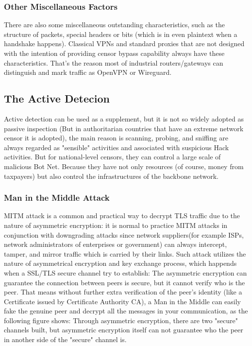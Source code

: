 \documentclass[conference]{IEEEtran}
\begin{document}

\subsubsection{Other Miscellaneous Factors}
There are also some miscellaneous outstanding characteristics, such as the structure of packets, special headers or bits (which is in even plaintext when a handshake happens). Classical VPNs and standard proxies that are not designed with the intention of providing censor bypass capability always have these characteristics. That's the reason most of industrial routers/gateways can distinguish and mark traffic as OpenVPN or Wireguard.

\subsection{The Active Detecion}
Active detection can be used as a supplement, but it is not so widely adopted as passive inspection (But in authoritarian countries that have an extreme network censor it is adopted), the main reason is scanning, probing, and sniffing are always regarded as "sensible" activities and associated with suspicious Hack activities. But for national-level censors, they can control a large scale of malicious Bot Net. Because they have not only resources (of course, money from taxpayers) but also control the infrastructures of the backbone network.

\subsubsection{Man in the Middle Attack}
MITM attack is a common and practical way to decrypt TLS traffic due to the nature of asymmetric encryption:
it is normal to practice MITM attacks in conjunction with downgrading attacks since network suppliers(for example ISPs, network administrators of enterprises or government) can always intercept, tamper, and mirror traffic which is carried by their links.
Such attack utilizes the nature of asymmetrical encryption and key exchange process, which happends when a SSL/TLS secure channel try to establish: The asymmetric encryption can guarantee the connection between peers is secure, but it cannot verify who is the peer. That means without further extra verification of the peer's identity (like a Certificate issued by Certificate Authority CA), a Man in the Middle can easily fake the genuine peer and decrypt all the messages in your communication, as the following figure shows: Through asymmetric encryption, there are two "secure" channels built, but asymmetric encryption itself can not guarantee who the peer in another side of the "secure" channel is.
\end{document}

